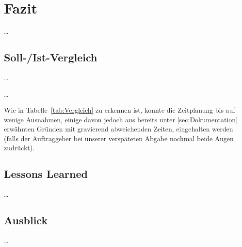 \section{Fazit} 
\label{sec:Fazit}

\dots

\subsection{Soll-/Ist-Vergleich}
\label{sec:SollIstVergleich}

\dots



\dots


Wie in Tabelle~\ref{tab:Vergleich} zu erkennen ist, konnte die Zeitplanung bis auf wenige Ausnahmen, einige davon jedoch aus bereits unter \ref{sec:Dokumentation} erwähnten Gründen mit gravierend abweichenden Zeiten, eingehalten werden (falls der Auftraggeber bei unserer verspäteten Abgabe nochmal beide Augen zudrückt).



\subsection{Lessons Learned}
\label{sec:LessonsLearned}

\dots

\subsection{Ausblick}
\label{sec:Ausblick}

\dots
